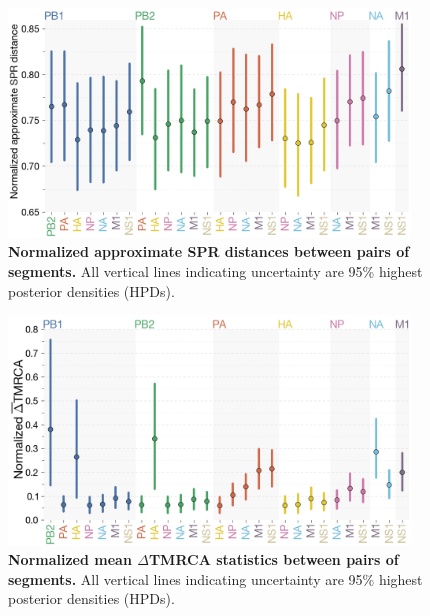 \documentclass[11pt,oneside,letterpaper]{article}
\begin{document}
\begin{figure}
	\centering		
	\includegraphics[width=0.95\textwidth]{figures/InfB_normalizedApproxSPR.png}
	\caption{\textbf{Normalized approximate SPR distances between pairs of segments.}
All vertical lines indicating uncertainty are 95\% highest posterior densities (HPDs).}
	\label{SPRdistances}
\end{figure}

\begin{figure}
	\centering		
	\includegraphics[width=0.95\textwidth]{figures/InfB_normalizedMuDeltaTMRCA.png}
	\caption{\textbf{Normalized mean $\Delta$TMRCA statistics between pairs of segments.}
All vertical lines indicating uncertainty are 95\% highest posterior densities (HPDs).}
	\label{deltaTMRCA}
\end{figure}
\end{document}

